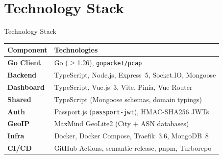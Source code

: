 \documentclass[aspectratio=169]{beamer}
\begin{document}
\section{Technology Stack}

\begin{frame}{Technology Stack}
    \begin{table}[]
        \centering
        \begin{tabular}{@{}ll@{}}
            \toprule
            \textbf{Component}   & \textbf{Technologies} \\ \midrule
            \textbf{Go Client}   & Go ($\ge$1.26), \texttt{gopacket/pcap} \\
            \textbf{Backend}     & TypeScript, Node.js, Express~5, Socket.IO, Mongoose \\
            \textbf{Dashboard}   & TypeScript, Vue.js~3, Vite, Pinia, Vue Router \\
            \textbf{Shared}      & TypeScript (Mongoose schemas, domain typings) \\
            \textbf{Auth}        & Passport.js (\texttt{passport-jwt}), HMAC-SHA256 JWTs \\
            \textbf{GeoIP}       & MaxMind GeoLite2 (City + ASN databases) \\
            \textbf{Infra}       & Docker, Docker Compose, Traefik~3.6, MongoDB~8 \\
            \textbf{CI/CD}       & GitHub Actions, semantic-release, pnpm, Turborepo \\ \bottomrule
        \end{tabular}
    \end{table}
\end{frame}
\end{document}
